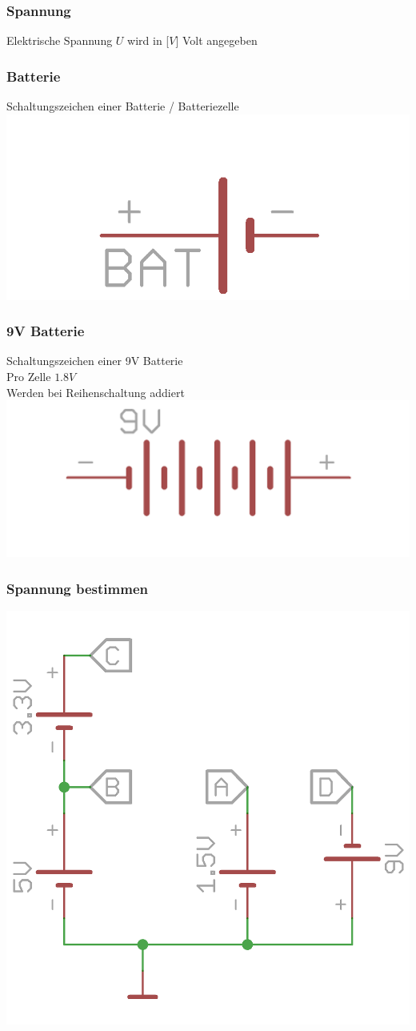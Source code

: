 \begin{frame}
    \frametitle{Spannung}
    \begin{center}
        Elektrische Spannung $U$ wird in [$V$] Volt angegeben
    \end{center}
\end{frame}

\begin{frame}
    \frametitle{Batterie}
    \begin{center}
    Schaltungszeichen einer Batterie / Batteriezelle\\
	\includegraphics[width=.7\textwidth]{e02/batterieEagle.png}
    \end{center}
\end{frame}

\begin{frame}
    \frametitle{9V Batterie}
    \begin{center}
    Schaltungszeichen einer 9V Batterie\\
    Pro Zelle $1.8V$\\
    Werden bei Reihenschaltung addiert\\
	\includegraphics[width=.99\textwidth]{e02/9vBatEagle.png}
    \end{center}
\end{frame}

\begin{frame}
    \frametitle{Spannung bestimmen}
    \begin{center}
	\includegraphics[width=.5\textwidth]{e02/Spannung.png}
    \end{center}
\end{frame}

